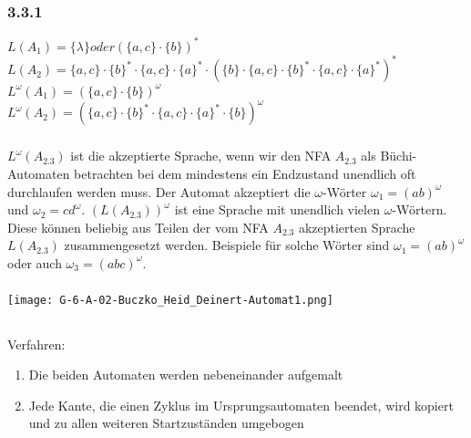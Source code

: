 \documentclass[a4paper,12pt]{scrartcl}
\title{\blatt}
\date{Gruppe 06}
\author{Sabrina Buczko 6663234, Julian Deinert 6535880, Rafael Heid 6704828}
\begin{document}
\maketitle
\newpage
\setcounter{section}{1}
\section{}
\setcounter{subsection}{3}
\subsection{}
\subsubsection{3.3.1}
$L(A_1)=\{\lambda\} oder (\{a,c\}\cdot\{b\})^*$\\
$L(A_2)=\{a,c\}\cdot\{b\}^* \cdot \{a,c\}\cdot \{a\}^* \cdot(\{b\}\cdot \{a,c\}\cdot\{b\}^* \cdot \{a,c\}\cdot \{a\}^*)^*$\\
$L^\omega (A_1)=(\{a,c\}\cdot\{b\})^\omega$\\
$L^\omega (A_2)=(\{a,c\}\cdot\{b\}^* \cdot \{a,c\}\cdot \{a\}^* \cdot\{b\})^\omega$

\subsubsection{}
$L^\omega(A_{2.3})$ ist die akzeptierte Sprache, wenn wir den NFA $A_{2.3}$ als 
Büchi-Automaten betrachten bei dem mindestens ein Endzustand unendlich oft 
durchlaufen werden muss. Der Automat akzeptiert die $\omega$-Wörter $\omega_1 = 
(ab)^\omega$ und $\omega_2 = cd^\omega$. $(L(A_{2.3}))^\omega$ ist eine Sprache 
mit unendlich vielen $\omega$-Wörtern. Diese können beliebig aus Teilen der vom 
NFA $A_{2.3}$ akzeptierten Sprache $L(A_{2.3})$ zusammengesetzt werden. 
Beispiele für solche Wörter sind $\omega_1 = (ab)^\omega$ oder auch $\omega_3 = 
(abc)^\omega$.
\subsubsection{}
\texttt{[image: G-6-A-02-Buczko\_Heid\_Deinert-Automat1.png]}
\subsection{}
\subsubsection{}
Verfahren:
\begin{enumerate}
\item Die beiden Automaten werden nebeneinander aufgemalt
\item Jede Kante, die einen Zyklus im Ursprungsautomaten beendet, wird kopiert 
und zu allen weiteren Startzuständen umgebogen
\end{enumerate}
\end{document}
